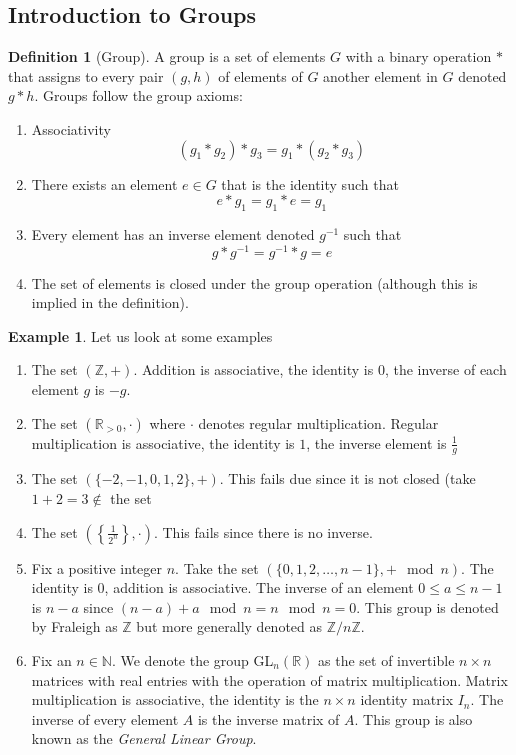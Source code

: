 \documentclass{article}
\newcommand{\R}{\mathbb{R}}
\newcommand{\Z}{\mathbb{Z}}
\newcommand{\N}{\mathbb{N}}
\theoremstyle{definition}
\newtheorem{definition}[theorem]{Definition}
\newtheorem{example}[theorem]{Example}
\begin{document}
\subsection{Introduction to Groups}
\begin{definition}[Group]
    A group is a set of elements $G$ with a binary operation $*$ that assigns to every pair $(g,h)$ of elements of $G$ another element in $G$ denoted $g*h$. Groups follow the group axioms:
    \begin{enumerate}
        \item Associativity
        \begin{equation*}
            (g_1*g_2)*g_3 = g_1*(g_2*g_3)
        \end{equation*}
        \item There exists an element $e\in G$ that is the identity such that 
        \begin{equation*}
            e*g_1=g_1*e=g_1
        \end{equation*}
        \item Every element has an inverse element denoted $g^{-1}$ such that 
        \begin{equation*}
            g*g^{-1} = g^{-1}*g = e
        \end{equation*}
        \item The set of elements is closed under the group operation (although this is implied in the definition).
    \end{enumerate}
\end{definition}
\begin{example}
    Let us look at some examples
    \begin{enumerate}
        \item The set $(\Z,+)$. Addition is associative, the identity is 0, the inverse of each element $g$ is $-g$. 
        \item The set $(\R_{>0}, \cdot)$ where $\cdot$ denotes regular multiplication. Regular multiplication is associative, the identity is $1$, the inverse element is $\frac{1}{g}$
        \item The set $(\{-2,-1,0,1,2\},+)$. This fails due since it is not closed (take $1+2=3 \notin $ the set
        \item The set $\left(\left\{ \frac{1}{2^n} \right\}, \cdot \right)$. This fails since there is no inverse.
        \item Fix a positive integer $n$. Take the set $\left( \{0,1,2,\ldots,n-1\}, +\mod n\right)$. The identity is 0, addition is associative. The inverse of an element $0\leq a\leq n-1$ is $n-a$ since $(n-a)+a \mod n = n\mod n = 0$. This group is denoted by Fraleigh as $\Z$ but more generally denoted as $\Z/n\Z$.
        \item Fix an $n\in \N$. We denote the group GL$_n(\R)$ as the set of invertible $n\times n$ matrices with real entries with the operation of matrix multiplication. Matrix multiplication is associative, the identity is the $n\times n$ identity matrix $I_n$. The inverse of every element $A$ is the inverse matrix of $A$. This group is also known as the \textit{General Linear Group}.
    \end{enumerate}
\end{example}
\end{document}
